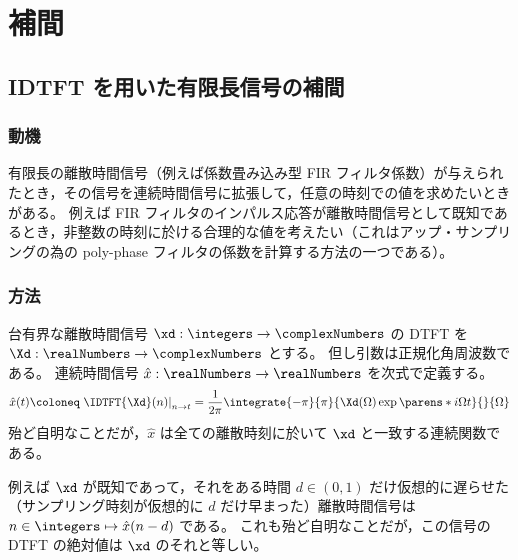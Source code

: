 \chapter{補間}
    \section{IDTFT を用いた有限長信号の補間}
        \label{IDTFT を用いた有限長信号の補間}
        \subsection{動機}
            有限長の離散時間信号（例えば係数畳み込み型 FIR フィルタ係数）が与えられたとき，その信号を連続時間信号に拡張して，任意の時刻での値を求めたいときがある。
            例えば FIR フィルタのインパルス応答が離散時間信号として既知であるとき，非整数の時刻に於ける合理的な値を考えたい（これはアップ・サンプリングの為の poly-phase フィルタの係数を計算する方法の一つである）。
        \subsection{方法}
            \label{IDTFT を用いた有限長信号の補間>方法}
            台有界な離散時間信号 $\xd:\integers\to\complexNumbers$ の DTFT を $\Xd:\realNumbers\to\complexNumbers$ とする。
            但し引数は正規化角周波数である。
            連続時間信号 $\hat{x}:\realNumbers\to\realNumbers$ を次式で定義する。
            \[ \hat{x}(t)\coloneq\left.\IDTFT{\Xd}(n)\right|_{n\to t} = \frac{1}{2\pi}\integrate{-\pi}{\pi}{\Xd(\Omega)\exp\parens*{i\Omega t}}{}{\Omega} \]
            殆ど自明なことだが，$\hat{x}$ は全ての離散時刻に於いて $\xd$ と一致する連続関数である。
            \par
            例えば $\xd$ が既知であって，それをある時間 $d\in(0,1)$ だけ仮想的に遅らせた（サンプリング時刻が仮想的に $d$ だけ早まった）離散時間信号は $n\in\integers\mapsto\hat{x}(n-d)$ である。
            これも殆ど自明なことだが，この信号の DTFT の絶対値は $\xd$ のそれと等しい。
